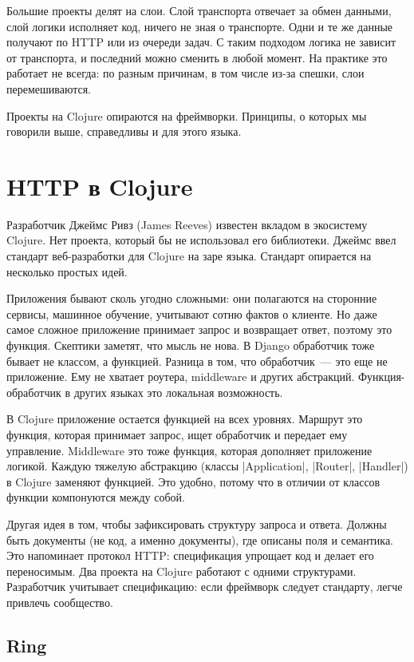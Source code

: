 Большие проекты делят на слои. Слой транспорта отвечает за обмен данными, слой
логики исполняет код, ничего не зная о транспорте. Одни и те же данные получают
по HTTP или из очереди задач. С таким подходом логика не зависит от транспорта,
и последний можно сменить в любой момент. На практике это работает не всегда: по
разным причинам, в том числе из-за спешки, слои перемешиваются.

Проекты на Clojure опираются на фреймворки. Принципы, о которых мы говорили
выше, справедливы и для этого языка.

\section{HTTP в Clojure}

Разработчик Джеймс Ривз (James Reeves)
известен вкладом в экосистему Clojure. Нет проекта, который бы не использовал
его библиотеки. Джеймс ввел стандарт веб-разработки для Clojure на заре
языка. Стандарт опирается на несколько простых идей.

Приложения бывают сколь угодно сложными: они полагаются на сторонние сервисы,
машинное обучение, учитывают сотню фактов о клиенте. Но даже самое сложное
приложение принимает запрос и возвращает ответ, поэтому это функция. Скептики
заметят, что мысль не нова. В Django обработчик тоже бывает не классом, а
функцией. Разница в том, что обработчик~--- это еще не приложение. Ему не
хватает роутера, middleware и других абстракций. Функция-обработчик в других
языках это локальная возможность.

В Clojure приложение остается функцией на всех уровнях. Маршрут это функция,
которая принимает запрос, ищет обработчик и передает ему управление. Middleware
это тоже функция, которая дополняет приложение логикой. Каждую тяжелую
абстракцию (классы \spverb|Application|, \spverb|Router|, \spverb|Handler|) в
Clojure заменяют функцией. Это удобно, потому что в отличии от классов функции
компонуются между собой.

Другая идея в том, чтобы зафиксировать структуру запроса и ответа. Должны быть
документы (не код, а именно документы), где описаны поля и семантика. Это
напоминает протокол HTTP: спецификация упрощает код и делает его
переносимым. Два проекта на Clojure работают с одними структурами. Разработчик
учитывает спецификацию: если фреймворк следует стандарту, легче привлечь
сообщество.

\subsection{Ring}

